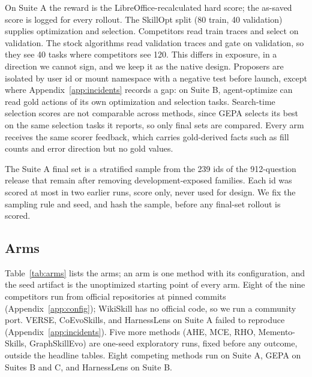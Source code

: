 On Suite A the reward is the LibreOffice-recalculated hard score; the as-saved score is logged for every rollout. The SkillOpt split (80 train, 40 validation) supplies optimization and selection. Competitors read train traces and select on validation. The stock \capevolve{} algorithms read validation traces and gate on validation, so they see 40 tasks where competitors see 120. This differs in exposure, in a direction we cannot sign, and we keep it as the native design. Proposers are isolated by user id or mount namespace with a negative test before launch, except where Appendix~\ref{app:incidents} records a gap: on Suite B, agent-optimize can read gold actions of its own optimization and selection tasks. Search-time selection scores are not comparable across methods, since GEPA selects its best on the same selection tasks it reports, so only final sets are compared. Every arm receives the same scorer feedback, which carries gold-derived facts such as fill counts and error direction but no gold values.

The Suite A final set is a stratified sample from the 239 ids of the 912-question release that remain after removing development-exposed families. Each id was scored at most in two earlier runs, score only, never used for design. We fix the sampling rule and seed, and hash the sample, before any final-set rollout is scored.

\subsection{Arms}

Table~\ref{tab:arms} lists the arms; an arm is one method with its configuration, and the seed artifact is the unoptimized starting point of every arm. Eight of the nine competitors run from official repositories at pinned commits (Appendix~\ref{app:config}); WikiSkill has no official code, so we run a community port. VERSE, CoEvoSkills, and HarnessLens on Suite A failed to reproduce (Appendix~\ref{app:incidents}). Five more methods (AHE, MCE, RHO, Memento-Skills, GraphSkillEvo) are one-seed exploratory runs, fixed before any outcome, outside the headline tables. Eight competing methods run on Suite A, GEPA on Suites B and C, and HarnessLens on Suite B.

